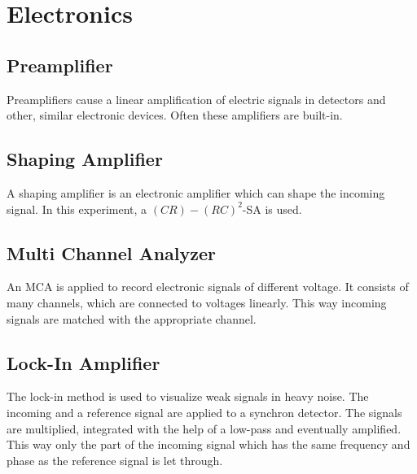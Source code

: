 \section{Electronics}
\subsection*{Preamplifier}
Preamplifiers cause a linear amplification of electric signals in detectors and other, similar electronic devices. Often these amplifiers are built-in.\\
\subsection*{Shaping Amplifier}
A shaping amplifier is an electronic amplifier which can shape the incoming signal. In this experiment, a $(CR)-(RC)^2$-SA is used. 
\subsection*{Multi Channel Analyzer}
An MCA is applied to record electronic signals of different voltage. It consists of many channels, which are connected to voltages linearly. This way incoming signals are matched with the appropriate channel.
\subsection*{Lock-In Amplifier}
The lock-in method is used to visualize weak signals in heavy noise. The incoming and a reference signal are applied to a synchron detector. The signals are multiplied, integrated with the help of a low-pass and eventually amplified. This way only the part of the incoming signal which has the same frequency and phase as the reference signal is let through.
